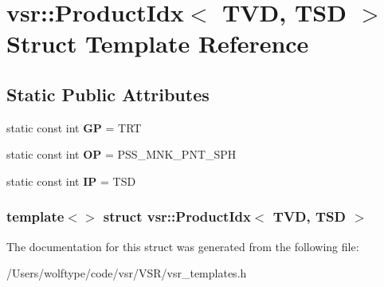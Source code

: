 \hypertarget{structvsr_1_1_product_idx_3_01_t_v_d_00_01_t_s_d_01_4}{\section{vsr\-:\-:Product\-Idx$<$ T\-V\-D, T\-S\-D $>$ Struct Template Reference}
\label{structvsr_1_1_product_idx_3_01_t_v_d_00_01_t_s_d_01_4}
}
\subsection*{Static Public Attributes}
\begin{DoxyCompactItemize}
\item 
\hypertarget{structvsr_1_1_product_idx_3_01_t_v_d_00_01_t_s_d_01_4_a6e55c8048911e93a222bece29346d48c}{static const int {\bfseries G\-P} = T\-R\-T}\label{structvsr_1_1_product_idx_3_01_t_v_d_00_01_t_s_d_01_4_a6e55c8048911e93a222bece29346d48c}

\item 
\hypertarget{structvsr_1_1_product_idx_3_01_t_v_d_00_01_t_s_d_01_4_a6b5e036fa9109a1bb00746679e6f30c1}{static const int {\bfseries O\-P} = P\-S\-S\-\_\-\-M\-N\-K\-\_\-\-P\-N\-T\-\_\-\-S\-P\-H}\label{structvsr_1_1_product_idx_3_01_t_v_d_00_01_t_s_d_01_4_a6b5e036fa9109a1bb00746679e6f30c1}

\item 
\hypertarget{structvsr_1_1_product_idx_3_01_t_v_d_00_01_t_s_d_01_4_acd6fff3e9823feaac0f5cf1211cc7b9c}{static const int {\bfseries I\-P} = T\-S\-D}\label{structvsr_1_1_product_idx_3_01_t_v_d_00_01_t_s_d_01_4_acd6fff3e9823feaac0f5cf1211cc7b9c}

\end{DoxyCompactItemize}
\subsubsection*{template$<$$>$ struct vsr\-::\-Product\-Idx$<$ T\-V\-D, T\-S\-D $>$}



The documentation for this struct was generated from the following file\-:\begin{DoxyCompactItemize}
\item 
/\-Users/wolftype/code/vsr/\-V\-S\-R/vsr\-\_\-templates.\-h\end{DoxyCompactItemize}
